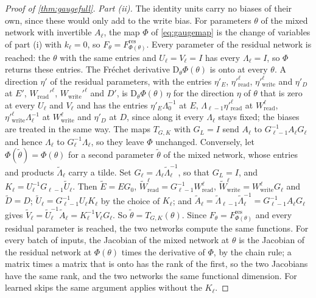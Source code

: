 \documentclass[10pt]{article}
\theoremstyle{definition}
\theoremstyle{remark}
\newcommand{\Wread}{W_{\mathrm{read}}}
\newcommand{\Wwrite}{W_{\mathrm{write}}}
\newcommand{\Der}{\mathrm{D}}
\begin{document}
\begin{proof}[Proof of \cref{thm:gaugefull}]
\emph{Part (ii).} The identity units carry no biases of their own, since these would only add to the write bias. For parameters $\theta$ of the mixed network with invertible $A_\ell$, the map $\Phi$ of \cref{eq:gaugemap} is the change of variables of part (i) with $k_\ell = 0$, so $F_\theta = F^{\mathrm{res}}_{\Phi(\theta)}$. Every parameter of the residual network is reached: the $\theta$ with the same entries and $U_\ell = V_\ell = I$ has every $\Lambda_\ell = I$, so $\Phi$ returns these entries. The Fr\'echet derivative $\Der_\theta\Phi(\theta)$ is onto at every $\theta$. A direction $\eta'$ of the residual parameters, with the entries $\eta'_E$, $\eta'^{\ell}_{\mathrm{read}}$, $\eta'^{\ell}_{\mathrm{write}}$ and $\eta'_D$ at $E'$, $\Wread'^{\ell}$, $\Wwrite'^{\ell}$ and $D'$, is $\Der_\theta\Phi(\theta)\,\eta$ for the direction $\eta$ of $\theta$ that is zero at every $U_\ell$ and $V_\ell$ and has the entries $\eta'_E\Lambda_0^{-1}$ at $E$, $\Lambda_{\ell-1}\eta'^{\ell}_{\mathrm{read}}$ at $\Wread^{\ell}$, $\eta'^{\ell}_{\mathrm{write}}\Lambda_\ell^{-1}$ at $\Wwrite^{\ell}$ and $\eta'_D$ at $D$, since along it every $\Lambda_\ell$ stays fixed; the biases are treated in the same way. The maps $T_{G,K}$ with $G_L = I$ send $A_\ell$ to $G_{\ell-1}^{-1}A_\ell G_\ell$ and hence $\Lambda_\ell$ to $G_\ell^{-1}\Lambda_\ell$, so they leave $\Phi$ unchanged. Conversely, let $\Phi(\tilde\theta) = \Phi(\theta)$ for a second parameter $\tilde\theta$ of the mixed network, whose entries and products $\tilde\Lambda_\ell$ carry a tilde. Set $G_\ell = \Lambda_\ell\tilde\Lambda_\ell^{-1}$, so that $G_L = I$, and $K_\ell = U_\ell^{-1}G_{\ell-1}\tilde U_\ell$. Then $\tilde E = EG_0$, $\widetilde W_{\mathrm{read}}^{\ell} = G_{\ell-1}^{-1}\Wread^{\ell}$, $\widetilde W_{\mathrm{write}}^{\ell} = \Wwrite^{\ell}G_\ell$ and $\tilde D = D$; $\tilde U_\ell = G_{\ell-1}^{-1}U_\ell K_\ell$ by the choice of $K_\ell$; and $\tilde A_\ell = \tilde\Lambda_{\ell-1}\tilde\Lambda_\ell^{-1} = G_{\ell-1}^{-1}A_\ell G_\ell$ gives $\tilde V_\ell = \tilde U_\ell^{-1}\tilde A_\ell = K_\ell^{-1}V_\ell G_\ell$. So $\tilde\theta = T_{G,K}(\theta)$. Since $F_\theta = F^{\mathrm{res}}_{\Phi(\theta)}$ and every residual parameter is reached, the two networks compute the same functions. For every batch of inputs, the Jacobian of the mixed network at $\theta$ is the Jacobian of the residual network at $\Phi(\theta)$ times the derivative of $\Phi$, by the chain rule; a matrix times a matrix that is onto has the rank of the first, so the two Jacobians have the same rank, and the two networks the same functional dimension. For learned skips the same argument applies without the $K_\ell$.


\end{proof}
\end{document}
